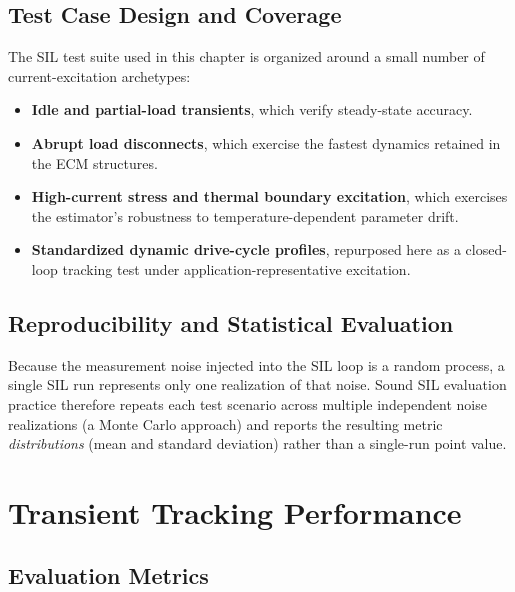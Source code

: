 \subsection{Test Case Design and Coverage}
\label{ssec:sil_test_design}

The SIL test suite used in this chapter is organized around a small number of current-excitation archetypes:

\begin{itemize}
	\item \textbf{Idle and partial-load transients}, which verify steady-state accuracy.
	\item \textbf{Abrupt load disconnects}, which exercise the fastest dynamics retained in the ECM structures.
	\item \textbf{High-current stress and thermal boundary excitation}, which exercises the estimator's robustness to temperature-dependent parameter drift.
	\item \textbf{Standardized dynamic drive-cycle profiles}, repurposed here as a closed-loop tracking test under application-representative excitation.
\end{itemize}

\subsection{Reproducibility and Statistical Evaluation}
\label{ssec:sil_reproducibility}

Because the measurement noise injected into the SIL loop is a random process, a single SIL run represents only one realization of that noise. Sound SIL evaluation practice therefore repeats each test scenario across multiple independent noise realizations (a Monte Carlo approach) and reports the resulting metric \emph{distributions} (mean and standard deviation) rather than a single-run point value.

\section{Transient Tracking Performance}
\label{sec:transient_tracking}

\subsection{Evaluation Metrics}
\label{ssec:transient_metrics}

